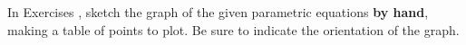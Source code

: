 {\noindent In Exercises}
{, sketch the graph of the given parametric equations \textbf{by hand}, making a table of points to plot. Be sure to indicate the orientation of the graph.
}
